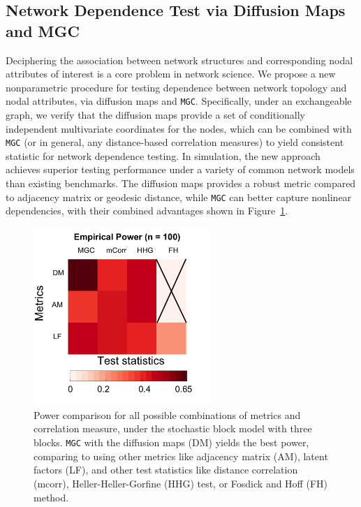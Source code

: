 \documentclass[simplex.tex]{subfiles}
\begin{document}
\subsection{Network Dependence Test via Diffusion Maps and MGC} 
Deciphering the association between network structures and corresponding
nodal attributes of interest is a core problem in network science. We
propose a new nonparametric procedure for testing dependence between
network topology and nodal attributes, via diffusion maps and
\texttt{MGC}. Specifically, under an exchangeable graph, we verify that
the diffusion maps provide a set of conditionally independent
multivariate coordinates for the nodes, which can be combined with
\texttt{MGC} (or in general, any distance-based correlation measures) to
yield consistent statistic for network dependence testing. In
simulation, the new approach achieves superior testing performance under
a variety of common network models than existing benchmarks. The
diffusion maps provides a robust metric compared to adjacency matrix or
geodesic distance, while \texttt{MGC} can better capture nonlinear
dependencies, with their combined advantages shown in
Figure~\ref{fig:threeSBM201701}.  

\begin{figure}[h!]
\begin{cframed}
		\centering
		\includegraphics[width=0.6\textwidth]{../../figs/ThreeSBM.png}
		\caption{Power comparison for all possible combinations of metrics and correlation measure, under the stochastic block model with three blocks. \texttt{MGC} with the diffusion maps (DM) yields the best power, comparing to using other metrics like adjacency matrix (AM), latent factors (LF), and other test statistics like distance correlation (mcorr), Heller-Heller-Gorfine (HHG) test, or Fosdick and Hoff (FH) method.}
		\label{fig:threeSBM201701}
		\end{cframed}
\end{figure}
\end{document}
